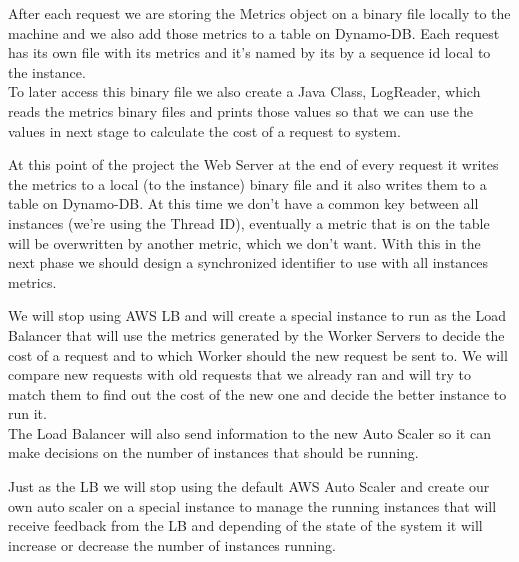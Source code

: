 \documentclass[times, 10pt,twocolumn]{article}
\begin{document}
   After each request we are storing the Metrics object on a binary file locally
   to the machine and we also add those metrics to a table on Dynamo-DB.
   Each request has its own file with its metrics and it's named by its by 
   a sequence id local to the instance.\\
   To later access this binary file we also create a Java Class, LogReader, 
   which reads the metrics binary files and prints those values so that we can 
   use the values in next stage to calculate the cost of a request to
   system.


   At this point of the project the Web Server at the end of every request 
   it writes the metrics to a local (to the instance) binary file and it 
   also writes them to a table on Dynamo-DB. At this time we don't have 
   a common key between all instances (we're using the Thread ID), eventually
   a metric that is on the table will be overwritten by another metric, which 
   we don't want. With this in the next phase we should design a synchronized
   identifier to use with all instances metrics.


   We will stop using AWS LB and will create a special instance to run as the 
   Load Balancer that will use the metrics generated by the Worker Servers to
   decide the cost of a request and to which Worker should the new request be
   sent to. We will compare new requests with old requests that we already ran
   and will try to match them to find out the cost of the new one and decide
   the better instance to run it.\\ 
   The Load Balancer will also send information to the new Auto Scaler so it 
   can make decisions on the number of instances that should be running.

   Just as the LB we will stop using the default AWS Auto Scaler and create our 
   own auto scaler on a special instance to manage the running instances that will 
   receive feedback from the LB and depending of the state of the system it will
   increase or decrease the number of instances running.\\\\
\end{document}
